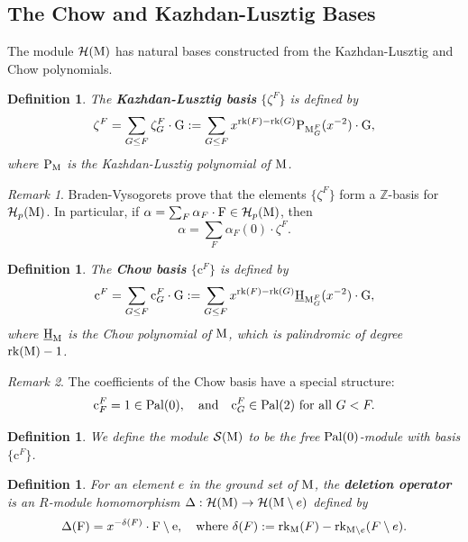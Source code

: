 \documentclass[11pt]{article}
\newcommand{\calH}{\mathcal{H}}
\newcommand{\calS}{\mathcal{S}}
\newcommand{\chow}{\normalfont\text{\underline{H}}}
\newcommand{\klpoly}{\normalfont\text{P}}
\newcommand{\rank}{\normalfont\text{rk}}
\newcommand{\M}{\normalfont\text{M}}
\newcommand{\ZZ}{\mathbb{Z}}
\newcommand{\Ebasis}[1]{\mathrm{#1}}
\newcommand{\Cbasis}[1]{\mathrm{c}^{#1}}
\newcommand{\CbasisSub}[2]{\mathrm{c}^{#1}_{#2}}
\newcommand{\Zbasis}[1]{\zeta^{#1}}
\newcommand{\ZbasisSub}[2]{\zeta^{#1}_{#2}}
\newcommand{\pal}{\normalfont\text{Pal}}
\newtheorem{definition}[theorem]{Definition}
\theoremstyle{remark}
\newtheorem*{remark}{Remark} %
\begin{document}
\subsection{The Chow and Kazhdan-Lusztig Bases}
The module \(\calH(\M)\) has natural bases constructed from the Kazhdan-Lusztig and Chow polynomials.

\begin{definition}
    The \textbf{Kazhdan-Lusztig basis} \(\{\Zbasis{F}\}\) is defined by
    \[ \Zbasis{F} = \sum_{G \le F} \ZbasisSub{F}{G}\cdot\Ebasis{G} := \sum_{G \le F} x^{\rank(F)-\rank(G)} \klpoly_{\M_G^F}(x^{-2}) \cdot \Ebasis{G}, \]
    where \(\klpoly_{\M}\) is the Kazhdan-Lusztig polynomial of \(\M\).
\end{definition}

\begin{remark}
    Braden-Vysogorets prove that the elements \(\{\Zbasis{F}\}\) form a \(\ZZ\)-basis for \(\calH_p(\M)\). In
    particular, if \(\alpha = \sum_F \alpha_F \cdot \Ebasis{F} \in \calH_p(\M)\), then
    \[ \alpha = \sum_F \alpha_F(0) \cdot \Zbasis{F}. \]
\end{remark}

\begin{definition}
    The \textbf{Chow basis} \(\{\Cbasis{F}\}\) is defined by
    \[
        \Cbasis{F} = \sum_{G\le F} \CbasisSub{F}{G}\cdot\Ebasis{G} :=
        \sum_{G \le F} x^{\rank(F)-\rank(G)} \chow_{\M_G^F}(x^{-2}) \cdot \Ebasis{G},
    \]
    where \(\chow_{\M}\) is the Chow polynomial of \(\M\), which is palindromic of degree \(\rank(\M)-1\).
\end{definition}

\begin{remark}
    The coefficients of the Chow basis have a special structure:
    \[\CbasisSub{F}{F} = 1 \in \pal(0),\quad\text{and}\quad\CbasisSub{F}{G} \in \pal(2)\ \text{for all}\ G < F.\]
\end{remark}
\begin{definition}
    We define the module \(\calS(\M)\) to be the free \(\pal(0)\)-module with basis \(\{\Cbasis{F}\}\).
\end{definition}

\begin{definition}
    For an element \(e\) in the ground set of \(\M\), the \textbf{deletion operator} is an \(R\)-module homomorphism \(\Delta : \calH(\M) \to \calH(\M \setminus e)\) defined by
    \[ \Delta(\Ebasis{F}) = x^{-\delta(F)}\cdot \Ebasis{F \setminus e}, \quad \text{where } \delta(F) := \rank_{\M}(F) - \rank_{\M\setminus e}(F \setminus e).\]
\end{definition}
\end{document}
